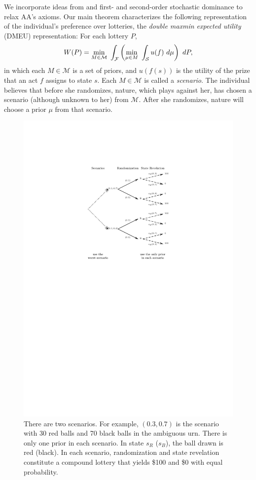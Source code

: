 \documentclass[12pt, notitlepage]{article}
\begin{document}
We incorporate ideas from \cite{GilboaSchmeidler89} and first- and
second-order stochastic dominance to relax AA's axioms. Our main theorem
characterizes the following representation of the individual's preference
over lotteries, the \textit{double maxmin expected utility} (DMEU)
representation: For each lottery $P$,%
\begin{equation*}
W(P)=\min_{M\in \mathcal{M}}~\int_{\mathcal{F}}\left( \underset{\mu \in M}{%
\min }~\int_{\mathcal{S}}u(f)~d\mu \right) ~dP,
\end{equation*}%
in which each $M\in \mathcal{M}$ is a set of priors, and $u(f(s))$ is the
utility of the prize that an act $f$ assigns to state $s$. Each $M\in 
\mathcal{M}$ is called a \textit{scenario}. The individual believes that
before she randomizes, nature, which plays against her, has chosen a
scenario (although unknown to her) from $\mathcal{M}$. After she randomizes,
nature will choose a prior $\mu $ from that scenario.

\begin{figure}[h!]
  \centering   
    \includegraphics{img/intro_eg1.pdf}
    \caption{There are
two scenarios. For example, $(0.3,0.7)$ is the scenario with 30 red balls
and 70 black balls in the ambiguous urn. There is only one prior in each
scenario. In state $s_{R}$ ($s_{B}$), the ball drawn is red (black). In each
scenario, randomization and state revelation constitute a compound lottery
that yields \$100 and \$0 with equal probability.}
\label{fig_intro_eg1}
\end{figure}
\end{document}
